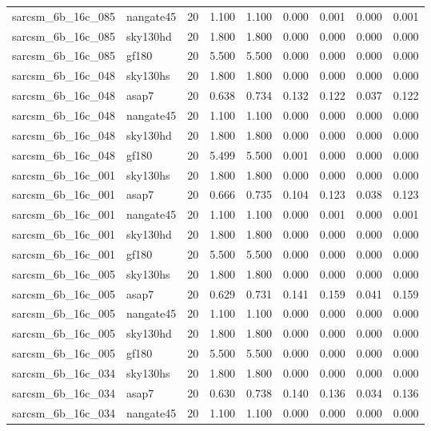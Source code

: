 \begin{tabular}{llrrrrrrr}
sarcsm\_6b\_16c\_085 & nangate45 & 20 & 1.100 & 1.100 & 0.000 & 0.001 & 0.000 & 0.001 \\
sarcsm\_6b\_16c\_085 & sky130hd & 20 & 1.800 & 1.800 & 0.000 & 0.000 & 0.000 & 0.000 \\
sarcsm\_6b\_16c\_085 & gf180 & 20 & 5.500 & 5.500 & 0.000 & 0.000 & 0.000 & 0.000 \\
sarcsm\_6b\_16c\_048 & sky130hs & 20 & 1.800 & 1.800 & 0.000 & 0.000 & 0.000 & 0.000 \\
sarcsm\_6b\_16c\_048 & asap7 & 20 & 0.638 & 0.734 & 0.132 & 0.122 & 0.037 & 0.122 \\
sarcsm\_6b\_16c\_048 & nangate45 & 20 & 1.100 & 1.100 & 0.000 & 0.000 & 0.000 & 0.000 \\
sarcsm\_6b\_16c\_048 & sky130hd & 20 & 1.800 & 1.800 & 0.000 & 0.000 & 0.000 & 0.000 \\
sarcsm\_6b\_16c\_048 & gf180 & 20 & 5.499 & 5.500 & 0.001 & 0.000 & 0.000 & 0.000 \\
sarcsm\_6b\_16c\_001 & sky130hs & 20 & 1.800 & 1.800 & 0.000 & 0.000 & 0.000 & 0.000 \\
sarcsm\_6b\_16c\_001 & asap7 & 20 & 0.666 & 0.735 & 0.104 & 0.123 & 0.038 & 0.123 \\
sarcsm\_6b\_16c\_001 & nangate45 & 20 & 1.100 & 1.100 & 0.000 & 0.001 & 0.000 & 0.001 \\
sarcsm\_6b\_16c\_001 & sky130hd & 20 & 1.800 & 1.800 & 0.000 & 0.000 & 0.000 & 0.000 \\
sarcsm\_6b\_16c\_001 & gf180 & 20 & 5.500 & 5.500 & 0.000 & 0.000 & 0.000 & 0.000 \\
sarcsm\_6b\_16c\_005 & sky130hs & 20 & 1.800 & 1.800 & 0.000 & 0.000 & 0.000 & 0.000 \\
sarcsm\_6b\_16c\_005 & asap7 & 20 & 0.629 & 0.731 & 0.141 & 0.159 & 0.041 & 0.159 \\
sarcsm\_6b\_16c\_005 & nangate45 & 20 & 1.100 & 1.100 & 0.000 & 0.000 & 0.000 & 0.000 \\
sarcsm\_6b\_16c\_005 & sky130hd & 20 & 1.800 & 1.800 & 0.000 & 0.000 & 0.000 & 0.000 \\
sarcsm\_6b\_16c\_005 & gf180 & 20 & 5.500 & 5.500 & 0.000 & 0.000 & 0.000 & 0.000 \\
sarcsm\_6b\_16c\_034 & sky130hs & 20 & 1.800 & 1.800 & 0.000 & 0.000 & 0.000 & 0.000 \\
sarcsm\_6b\_16c\_034 & asap7 & 20 & 0.630 & 0.738 & 0.140 & 0.136 & 0.034 & 0.136 \\
sarcsm\_6b\_16c\_034 & nangate45 & 20 & 1.100 & 1.100 & 0.000 & 0.000 & 0.000 & 0.000 \\

\end{tabular}
